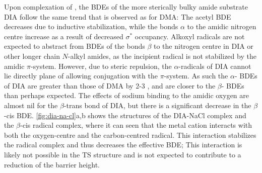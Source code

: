 \begin{doublespace}
Upon complexation of , the BDEs of the more sterically bulky amide
substrate DIA follow the same trend that is observed as for DMA: The acetyl
 BDE decreases due to inductive stabilization, while the  bonds
$\alpha$ to the amidic nitrogen centre increase as a result of decreased
 $\sigma^*$ occupancy. Alkoxyl radicals are not expected to abstract
from  BDEs of the bonds $\beta$ to the nitrogen centre in DIA or other
longer chain $N$-alkyl amides, as the incipient radical is not stabilized by the
amidic $\pi$-system. However, due to steric repulsion, the $\alpha$-radicals of
DIA cannot lie directly plane of allowing conjugation with the $\pi$-system. As
such the $\alpha$- BDEs of DIA are greater than those of DMA by 2-3
\kcalmol, and are closer to the $\beta$- BDEs than perhaps expected. The
effects of sodium binding to the amidic oxygen are almost nil for the
$\beta$-trans  bond of DIA, but there is a significant decrease in
the $\beta$-cis  BDE. \ref{fig:dia-na-cl}a,b shows the structures of the
DIA-NaCl complex and the $\beta$-cis radical complex, where it can seen that the
metal cation interacts with both the oxygen-centre and the carbon-centred
radical. This interaction stabilizes the radical complex and thus decreases the
effective BDE; This interaction is likely not possible in the TS
structure and is not expected to contribute to a reduction of the barrier
height.

\begin{figure}[!htbp]
	\centering



\end{figure}
\end{doublespace}
